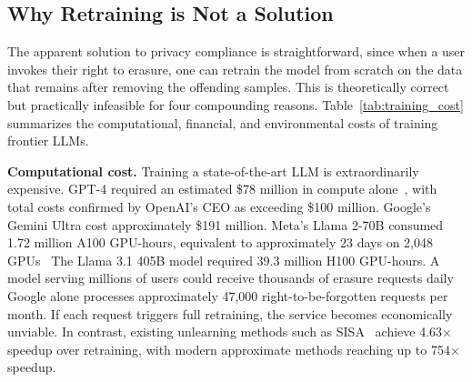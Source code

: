 \subsection{Why Retraining is Not a Solution}\label{subsec:no_retrain}

The apparent solution to privacy compliance is straightforward, since when a user invokes their right to erasure, one can retrain the model from scratch on the data that remains after removing the offending samples. This is theoretically correct but practically infeasible for four compounding reasons. Table~\ref{tab:training_cost} summarizes the computational, financial, and environmental costs of training frontier LLMs.

\textbf{Computational cost.} Training a state-of-the-art LLM is extraordinarily expensive. GPT-4 required an estimated \$78 million in compute alone~\citeauthor{maslej2025artificial}, with total costs confirmed by OpenAI's CEO as exceeding \$100 million. Google's Gemini Ultra cost approximately \$191 million. Meta's Llama 2-70B consumed 1.72 million A100 GPU-hours, equivalent to approximately 23 days on 2,048 GPUs~\citeauthor{touvron2023llama} The Llama 3.1 405B model required 39.3 million H100 GPU-hours. A model serving millions of users could receive thousands of erasure requests daily  Google alone processes approximately 47,000 right-to-be-forgotten requests per month. If each request triggers full retraining, the service becomes economically unviable. In contrast, existing unlearning methods such as SISA~\citeauthor{bourtoule2021machine} achieve 4.63$\times$ speedup over retraining, with modern approximate methods reaching up to 754$\times$ speedup.


